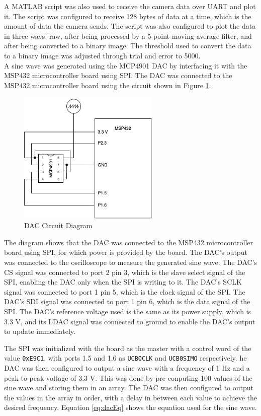\documentclass[CMPE]{KGCOEReport}
\begin{document}
A MATLAB script was also used to receive the camera data over UART and plot it. The script was configured to receive 128 bytes of data at a time, which is the amount of data the camera sends. The script was also configured to plot the data in three ways: raw, after being processed by a 5-point moving average filter, and after being converted to a binary image. The threshold used to convert the data to a binary image was adjusted through trial and error to 5000.\\

A sine wave was generated using the MCP4901 DAC by interfacing it with the MSP432 microcontroller board using SPI. The DAC was connected to the MSP432 microcontroller board using the circuit shown in Figure \ref{fig:dacDiagram}.

\begin{figure}[H]
    \centering
    \includegraphics[width=0.6\textwidth]{dacDiagram.png}
    \caption{DAC Circuit Diagram}
    \label{fig:dacDiagram}
\end{figure}

The diagram shows that the DAC was connected to the MSP432 microcontroller board using SPI, for which power is provided by the board. The DAC's output was connected to the oscilloscope to measure the generated sine wave. The DAC's CS signal was connected to port 2 pin 3, which is the slave select signal of the SPI, enabling the DAC only when the SPI is writing to it. The DAC's SCLK signal was connected to port 1 pin 5, which is the clock signal of the SPI. The DAC's SDI signal was connected to port 1 pin 6, which is the data signal of the SPI. The DAC's reference voltage used is the same as its power supply, which is 3.3 V, and its LDAC signal was connected to ground to enable the DAC's output to update immediately.

The SPI was initialized with the board as the master with a control word of the value \verb|0xE9C1|, with ports 1.5 and 1.6 as \verb|UCB0CLK| and \verb|UCB0SIMO| respectively. he DAC was then configured to output a sine wave with a frequency of 1 Hz and a peak-to-peak voltage of 3.3 V. This was done by pre-conputing 100 values of the sine wave and storing them in an array. The DAC was then configured to output the values in the array in order, with a delay in between each value to achieve the desired frequency. Equation \ref{eq:dacEq} shows the equation used for the sine wave.
\end{document}
